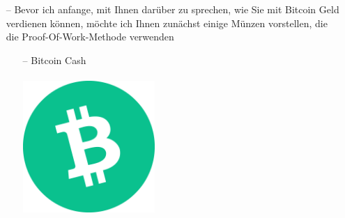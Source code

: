 \documentclass[ngerman]{scrreprt}
\begin{document}
\begin{itemize}
	\item[--] Bevor ich anfange, mit Ihnen darüber zu sprechen, wie Sie mit Bitcoin Geld verdienen können, möchte ich Ihnen zunächst einige Münzen vorstellen, die die Proof-Of-Work-Methode verwenden
	\begin{itemize}
		\item [--] {Bitcoin Cash} \\ \\ 
		\includegraphics[width=5cm,height=5cm]{bitcoincash.png}\\ \\
		

\end{itemize}
\end{itemize}
\end{document}

